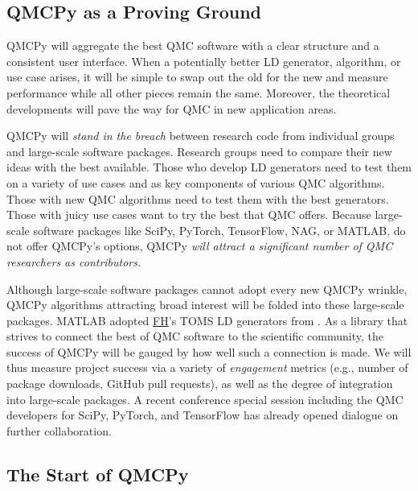 \documentclass[11pt]{NSFamsart}
\newcommand{\cmtS}[1]{{\color{blue}{(Simon: #1)}}}
\newcommand{\FH}{\hyperlink{FHlink}{FH}\xspace}
\newcommand{\SciPy}{SciPy\xspace}
\newcommand{\TensorFlow}{TensorFlow\xspace}
\newcommand{\NAG}{NAG\xspace}
\newcommand{\MATLAB}{MATLAB\xspace}
\newcommand{\PyTorch}{PyTorch\xspace}
\begin{document}
\subsection{QMCPy as a Proving Ground} \label{sec:provingground}
\cmtS{Fred \& Yuhan: maybe shorten the writing below, and focus on QMCPy as a vessel for connecting our new methods (\& existing state-of-the-art) to scientific practitioners who will use such tools for cost-efficient solutions to cutting-edge scientific problems.} QMCPy will aggregate the best QMC software with a clear structure and a consistent user interface.  When a potentially better LD generator, algorithm, or use case arises, it will be simple to swap out the old for the new and measure performance while all other pieces remain the same.  Moreover, the theoretical developments will pave the way for QMC in new application areas.

QMCPy will \emph{stand in the breach} between research code from individual groups and large-scale software packages.  Research groups need to compare their new ideas with the best available.  Those who develop LD generators need to test them on a variety of use cases and as key components of various QMC algorithms.  Those with new QMC algorithms need to test them with the best generators.  Those with juicy use cases want to try the best that QMC offers.  Because large-scale software packages like \SciPy, \PyTorch, \TensorFlow, \NAG, or \MATLAB, do not offer QMCPy's options,  QMCPy \emph{will attract a significant number of QMC researchers as contributors.}

Although large-scale software packages cannot adopt every new QMCPy wrinkle, QMCPy algorithms attracting broad interest will be folded into these large-scale packages. MATLAB adopted \FH's TOMS LD generators from \cite{HonHic00a}. As a library that strives to connect the best of QMC software to the scientific community, the success of QMCPy will be gauged by how well such a connection is made. We will thus measure project success via a variety of \emph{engagement} metrics (e.g., number of package downloads, GitHub pull requests), as well as the degree of integration into large-scale packages.  A recent conference special session including the QMC developers for \SciPy, \PyTorch, and \TensorFlow has already opened dialogue on further collaboration.

\subsection*{The Start of QMCPy}
\end{document}
